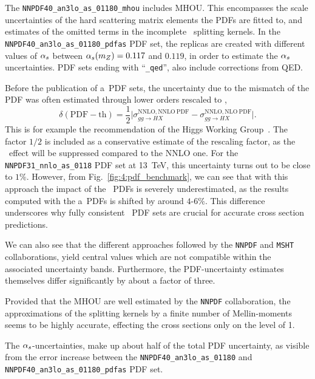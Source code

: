 The \texttt{NNPDF40\_an3lo\_as\_01180\_mhou} includes \acs{MHOU}. This encompasses the scale uncertainties of the hard scattering matrix elements the \acs{PDF}s are fitted to, and estimates of the omitted terms in the incomplete \NNNLO\ splitting kernels. In the \texttt{NNPDF40\_an3lo\_as\_01180\_pdfas} \acs{PDF} set, the replicas are created with different values of $\alpha_s$ between $\alpha_s (m_Z) = 0.117$ and $0.119$, in order to estimate the $\alpha_s$ uncertainties. \acs{PDF} sets ending with ``\texttt{\_qed}'', also include corrections from \acs{QED}.

Before the publication of a\NNNLO\ \acs{PDF} sets, the uncertainty due to the mismatch of the \acs{PDF} was often estimated through lower orders rescaled to \NNNLO,
\begin{equation}
\delta (\mathrm{PDF-th}) = \frac{1}{2} \Big \vert \sigma_{gg \rightarrow HX}^{\mathrm{NNLO}, \mathrm{NNLO\ PDF}} - \sigma_{gg \rightarrow HX}^{\mathrm{NNLO}, \mathrm{NLO\ PDF}} \Big \vert .
\end{equation}
This is for example the recommendation of the Higgs Working Group~\cite{LHCHiggsCrossSectionWorkingGroup:2016ypw}. The factor $1/2$ is included as a conservative estimate of the rescaling factor, as the \NNNLO\ effect will be suppressed compared to the \acs{NNLO} one.
For the \texttt{NNPDF31\_nnlo\_as\_0118} \acs{PDF} set at 13~TeV, this uncertainty turns out to be close to $1\%$. However, from Fig.~\ref{fig:4:pdf_benchmark}, we can see that with this approach the impact of the \NNNLO\ \acs{PDF}s is severely underestimated, as the results computed with the a\NNNLO\ \acs{PDF}s is shifted by around $4$-$6\%$. This difference underscores why fully consistent \NNNLO\ \acs{PDF} sets are crucial for accurate cross section predictions.

We can also see that the different approaches followed by the \texttt{NNPDF} and \texttt{MSHT} collaborations, yield central values which are not compatible within the associated uncertainty bands. Furthermore, the \acs{PDF}-uncertainty estimates themselves differ significantly by about a factor of three.

Provided that the \acs{MHOU} are well estimated by the \texttt{NNPDF} collaboration, the approximations of the splitting kernels by a finite number of Mellin-moments seems to be highly accurate, effecting the cross sections only on the level of 1\textperthousand.

The $\alpha_s$-uncertainties, make up about half of the total \acs{PDF} uncertainty, as visible from the error increase between the \texttt{NNPDF40\_an3lo\_as\_01180} and \texttt{NNPDF40\_an3lo\_as\_01180\_pdfas} \acs{PDF} set.

